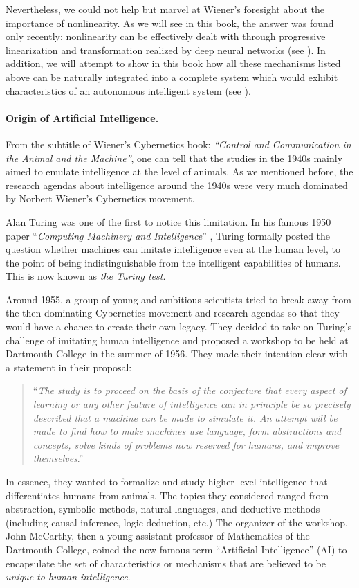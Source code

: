 \documentclass[../../book-main.tex]{subfiles}
\begin{document}
Nevertheless, we could not help but marvel at Wiener's foresight about the importance of nonlinearity. As we will see in this book, the answer was found only recently: nonlinearity can be effectively dealt with through progressive linearization and transformation realized by deep neural networks (see ). In addition, we will attempt to show in this book how all these mechanisms listed above can be naturally integrated into a complete system which would exhibit characteristics of an autonomous intelligent system (see ). 

\paragraph{Origin of Artificial Intelligence.}
From the subtitle of Wiener's Cybernetics book: {\em ``Control and Communication in the Animal and the Machine''}, one can tell that the studies in the 1940s mainly aimed to emulate intelligence at the level of animals. As we mentioned before, the research agendas about intelligence around the 1940s were very much dominated by Norbert Wiener's Cybernetics movement. 

Alan Turing was one of the first to notice this limitation. In his famous 1950 paper ``{\em Computing Machinery and Intelligence}'' \cite{Turing-1950}, Turing formally posted the question whether machines can imitate intelligence even at the human level, to the point of being indistinguishable from the intelligent capabilities of humans. This is now known as {\em the Turing test}. 

Around 1955, a group of young and ambitious scientists tried to break away from the then dominating Cybernetics movement and research agendas so that they would have a chance to create their own legacy. They decided to take on Turing's challenge of imitating human intelligence and proposed a workshop to be held at Dartmouth College in the summer of 1956. They made their intention clear with a statement in their proposal: 
\begin{quote}
    ``{\em The study is to proceed on the basis of the conjecture that every aspect of learning or any other feature of intelligence can in principle be so precisely described that a machine can be made to simulate it. An attempt will be made to find how to make machines use language, form abstractions and concepts, solve kinds of problems now reserved for humans, and improve themselves}.'' 
\end{quote}
In essence, they wanted to formalize and study higher-level intelligence that differentiates humans from animals. The topics they considered ranged from abstraction, symbolic methods, natural languages, and deductive methods (including causal inference, logic deduction, etc.) The organizer of the workshop, John McCarthy, then a young assistant professor of Mathematics of the Dartmouth College, coined the now famous term ``Artificial Intelligence'' (AI) to encapsulate the set of characteristics or mechanisms that are believed to be {\em unique to human intelligence}. 
\end{document}
